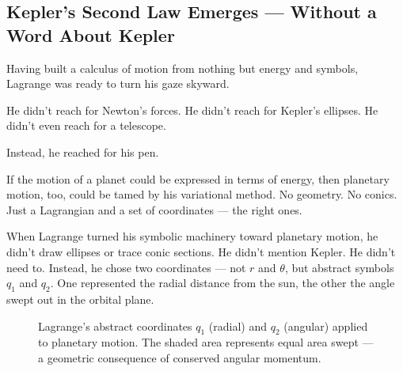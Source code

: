 \subsection{Kepler’s Second Law Emerges — Without a Word About Kepler}

Having built a calculus of motion from nothing but energy and symbols, Lagrange was ready to turn his gaze skyward.

He didn’t reach for Newton’s forces. He didn’t reach for Kepler’s ellipses. He didn’t even reach for a telescope.

Instead, he reached for his pen.

If the motion of a planet could be expressed in terms of energy, then planetary motion, too, could be tamed by his variational method. No geometry. No conics. Just a Lagrangian and a set of coordinates — the right ones.

When Lagrange turned his symbolic machinery toward planetary motion, he didn’t draw ellipses or trace conic sections. He didn’t mention Kepler. He didn’t need to. Instead, he chose two coordinates — not \( r \) and \( \theta \), but abstract symbols \( q_1 \) and \( q_2 \). One represented the radial distance from the sun, the other the angle swept out in the orbital plane.


\begin{figure}[H]
\centering
{}
\caption{Lagrange’s abstract coordinates \( q_1 \) (radial) and \( q_2 \) (angular) applied to planetary motion. The shaded area represents equal area swept — a geometric consequence of conserved angular momentum.}
\end{figure}


